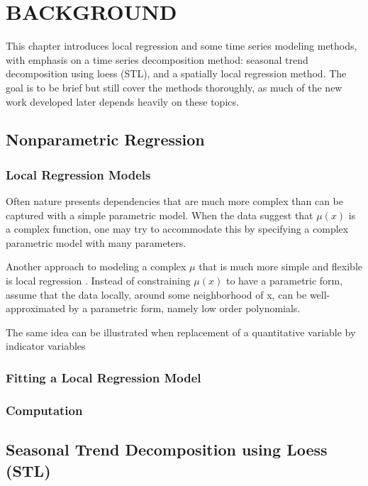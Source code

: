 \chapter{BACKGROUND}

This chapter introduces local regression and some time series modeling methods,
with emphasis on a time series decomposition method: seasonal trend decomposition
using loess (STL), and a spatially local regression method. The goal is to be
brief but still cover the methods thoroughly, as much of the new work developed
later depends heavily on these topics.

\section{Nonparametric Regression}


\subsection{Local Regression Models}

Often nature presents dependencies that are much more complex than can be captured
with a simple parametric model. When the data suggest that $\mu(x)$ is a complex
function, one may try to accommodate this by specifying a complex parametric model
with many parameters.

Another approach to modeling a complex $\mu$ that is much more simple and flexible
is local regression \cite{Cleveland:1979}. Instead of constraining $\mu(x)$ to 
have a parametric form, assume that the data locally, around some neighborhood of
x, can be well-approximated by a parametric form, namely low order polynomials.

The same idea can be illustrated when replacement of a quantitative variable by
indicator variables 

\subsection{Fitting a Local Regression Model}


\subsection{Computation}

\section{Seasonal Trend Decomposition using Loess (STL)}

